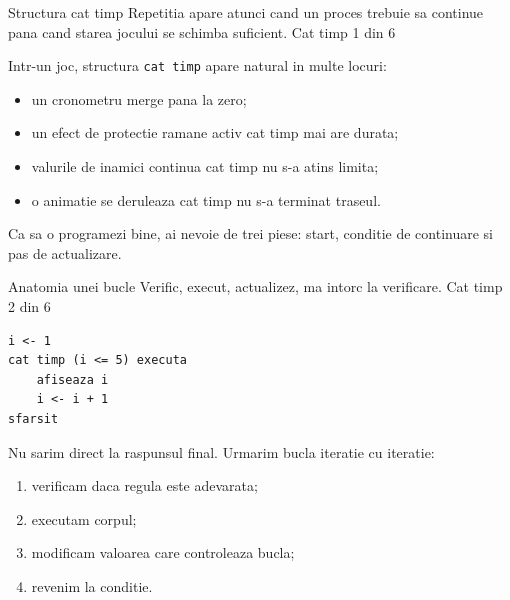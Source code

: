 \PageHeader
  {Structura cat timp}
  {Repetitia apare atunci cand un proces trebuie sa continue pana cand starea jocului se schimba suficient.}
  {Cat timp 1 din 6}

\begin{missionbox}
Intr-un joc, structura \texttt{cat timp} apare natural in multe locuri:
\begin{itemize}
\item un cronometru merge pana la zero;
\item un efect de protectie ramane activ cat timp mai are durata;
\item valurile de inamici continua cat timp nu s-a atins limita;
\item o animatie se deruleaza cat timp nu s-a terminat traseul.
\end{itemize}

Ca sa o programezi bine, ai nevoie de trei piese: start, conditie de continuare si pas de actualizare.
\end{missionbox}


\clearpage

\PageHeader
  {Anatomia unei bucle}
  {Verific, execut, actualizez, ma intorc la verificare.}
  {Cat timp 2 din 6}

\begin{examplebox}
\begin{lstlisting}[style=codequest]
i <- 1
cat timp (i <= 5) executa
    afiseaza i
    i <- i + 1
sfarsit
\end{lstlisting}
\end{examplebox}

\begin{missionbox}
Nu sarim direct la raspunsul final. Urmarim bucla iteratie cu iteratie:
\begin{enumerate}
\item verificam daca regula este adevarata;
\item executam corpul;
\item modificam valoarea care controleaza bucla;
\item revenim la conditie.
\end{enumerate}
\end{missionbox}


